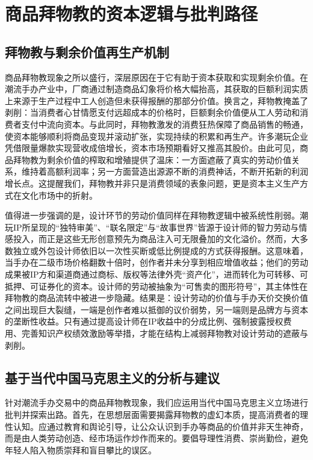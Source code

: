 
\chapter{商品拜物教的资本逻辑与批判路径}
\section{拜物教与剩余价值再生产机制}
商品拜物教现象之所以盛行，深层原因在于它有助于资本获取和实现剩余价值。在潮流手办产业中，厂商通过制造商品幻象将价格大幅抬高，其获取的巨额利润实质上来源于生产过程中工人创造但未获得报酬的那部分价值。换言之，拜物教掩盖了剥削：当消费者心甘情愿支付远超成本的价格时，巨额剩余价值便从工人劳动和消费者支付中流向资本。与此同时，拜物教激发的消费狂热保障了商品销售的畅通，使资本能够顺利将商品变现并滚动扩张，实现持续的积累和再生产。许多潮玩企业凭借限量爆款实现营收成倍增长，资本市场预期看好又推高其股价。由此可见，商品拜物教为剩余价值的榨取和增殖提供了温床：一方面遮蔽了真实的劳动价值关系，维持着高额利润率；另一方面营造出源源不断的消费神话，不断开拓新的利润增长点。这提醒我们，拜物教并非只是消费领域的表象问题，更是资本主义生产方式在文化市场中的折射。

值得进一步强调的是，设计环节的劳动价值同样在拜物教逻辑中被系统性削弱。潮玩IP所呈现的“独特审美”、“联名限定”与“故事世界”皆源于设计师的智力劳动与情感投入，而正是这些无形创意预先为商品注入可无限叠加的文化溢价。然而，大多数独立或外包设计师依旧以一次性买断或低比例提成的方式获得报酬。这意味着，当手办在二级市场价格翻数十倍时，创作者并未分享到相应增值收益；他们的劳动成果被IP方和渠道商通过商标、版权等法律外壳“资产化”，进而转化为可转移、可抵押、可证券化的资本。设计师的劳动被抽象为“可售卖的图形符号”，其主体性在拜物教的商品流转中被进一步隐藏。结果是：设计劳动的价值与手办天价交换价值之间出现巨大裂缝，一端是创作者难以抵御的议价弱势，另一端则是品牌方与资本的垄断性收益。只有通过提高设计师在IP收益中的分成比例、强制披露授权费用、完善知识产权绩效激励等举措，才能在结构上减弱拜物教对设计劳动的遮蔽与剥削。
\section{基于当代中国马克思主义的分析与建议}
针对潮流手办交易中的商品拜物教现象，我们应运用当代中国马克思主义立场进行批判并探索出路。首先，在思想层面需要揭露拜物教的虚幻本质，提高消费者的理性认知。应通过教育和舆论引导，让公众认识到手办等商品的价值并非天生神奇，而是由人类劳动创造、经市场运作炒作而来的。要倡导理性消费、崇尚勤俭，避免年轻人陷入物质崇拜和盲目攀比的误区。


